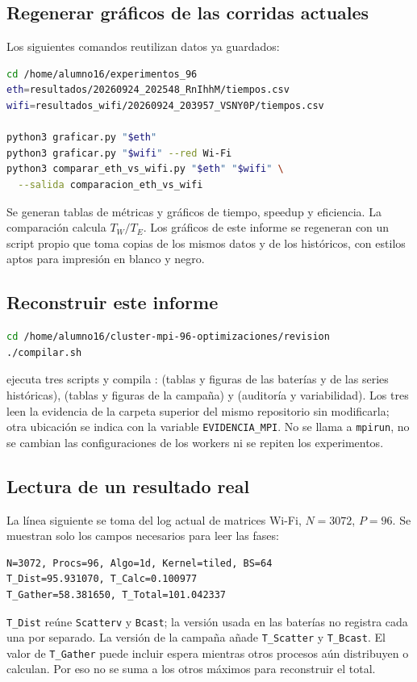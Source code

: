 \subsection{Regenerar gráficos de las corridas actuales}
Los siguientes comandos reutilizan datos ya guardados:
\begin{lstlisting}[language=bash]
cd /home/alumno16/experimentos_96
eth=resultados/20260924_202548_RnIhhM/tiempos.csv
wifi=resultados_wifi/20260924_203957_VSNY0P/tiempos.csv

python3 graficar.py "$eth"
python3 graficar.py "$wifi" --red Wi-Fi
python3 comparar_eth_vs_wifi.py "$eth" "$wifi" \
  --salida comparacion_eth_vs_wifi
\end{lstlisting}
Se generan tablas de métricas y gráficos de tiempo, speedup y eficiencia. La comparación calcula $T_W/T_E$. Los gráficos de este informe se regeneran con un script propio que toma copias de los mismos datos y de los históricos, con estilos aptos para impresión en blanco y negro.

\subsection{Reconstruir este informe}
\begin{lstlisting}[language=bash]
cd /home/alumno16/cluster-mpi-96-optimizaciones/revision
./compilar.sh
\end{lstlisting}
 ejecuta tres scripts y compila :  (tablas y figuras de las baterías y de las series históricas),  (tablas y figuras de la campaña) y  (auditoría y variabilidad). Los tres leen la evidencia de la carpeta superior del mismo repositorio sin modificarla; otra ubicación se indica con la variable \texttt{EVIDENCIA\_MPI}. No se llama a \texttt{mpirun}, no se cambian las configuraciones de los workers ni se repiten los experimentos.

\subsection{Lectura de un resultado real}
La línea siguiente se toma del log actual de matrices Wi-Fi, $N=3072$, $P=96$. Se muestran solo los campos necesarios para leer las fases:
\begin{lstlisting}
N=3072, Procs=96, Algo=1d, Kernel=tiled, BS=64
T_Dist=95.931070, T_Calc=0.100977
T_Gather=58.381650, T_Total=101.042337
\end{lstlisting}
\texttt{T\_Dist} reúne \texttt{Scatterv} y \texttt{Bcast}; la versión usada en las baterías no registra cada una por separado. La versión de la campaña añade \texttt{T\_Scatter} y \texttt{T\_Bcast}. El valor de \texttt{T\_Gather} puede incluir espera mientras otros procesos aún distribuyen o calculan. Por eso no se suma a los otros máximos para reconstruir el total.

